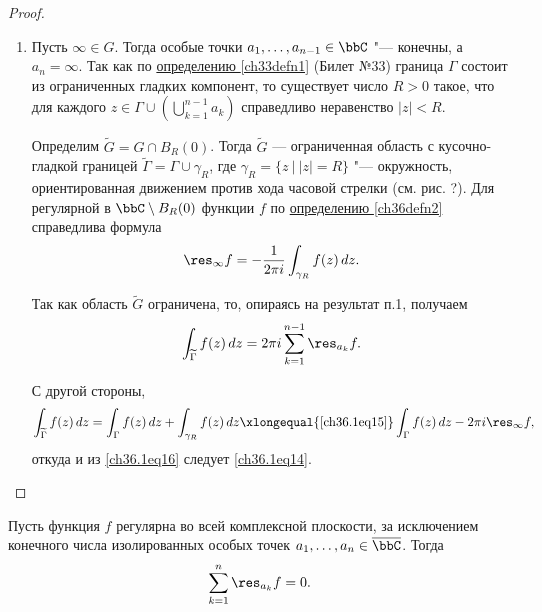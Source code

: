 \begin{leftbar}
\begin{proof}
\begin{enumerate}[wide, labelwidth=!, labelindent=0pt]
\item	Пусть $\infty \in G$. Тогда особые точки $a_1,\ldots,a_{n - 1} \in \bbC$ "--- конечны, а $a_n = \infty$. Так как по \hyperref[ch33defn1]{определению \ref{ch33defn1}} (Билет №33) граница $\Gamma$ состоит из ограниченных гладких компонент, то существует число $R > 0$ такое, что для каждого $z \in \Gamma \cup \left( \bigcup\limits_{k = 1}^{n - 1} a_k \right)$ справедливо неравенство $|z| < R$.

Определим $\widetilde{G} = G \cap B_R(0)$. Тогда $\widetilde G$ — ограниченная область с кусочно-гладкой границей $\widetilde{\Gamma} = \Gamma \cup \gamma_R$, где $\gamma_R = \{ z \: \big| \: |z| = R\}$ "--- окружность, ориентированная движением против хода часовой стрелки (см. рис. ?). Для регулярной в $\bbC \setminus B_R(0)$ функции $f$ по \hyperref[ch36defn2]{определению \ref{ch36defn2}} справедлива формула
\begin{equation} \label{ch36.1eq15}
\res_{\infty} f = - \frac{1}{2\pi i} \int_{\gamma_R} f(z) \,dz.
\end{equation}

Так как область $\widetilde{G}$ ограничена, то, опираясь на результат п.1, получаем
\begin{equation} \label{ch36.1eq16}
\int_{\widetilde{\Gamma}} f(z) \,dz = 2\pi i \sum_{k = 1}^{n - 1} \res_{a_k} f.
\end{equation}
 
С другой стороны,
$$
\int_{\widetilde{\Gamma}} f(z) \,dz = \int_{\Gamma} f(z) \,dz + \int_{\gamma_R} f(z) \,dz \xlongequal{\eqref{ch36.1eq15}} \int_{\Gamma} f(z) \,dz - 2\pi i\res_{\infty} f,
$$
откуда и из \eqref{ch36.1eq16} следует \eqref{ch36.1eq14}.	$\hfill\qedhere$
\end{enumerate}
\end{proof}
\end{leftbar}

\begin{cons}
Пусть функция $f$ регулярна во всей комплексной плоскости, за исключением конечного числа изолированных особых точек $a_1,\ldots,a_n \in \overline{\bbC}$. Тогда
\begin{equation} \label{ch36.1eq17}
\sum_{k = 1}^{n} \res_{a_k} f = 0.
\end{equation}
\end{cons}

